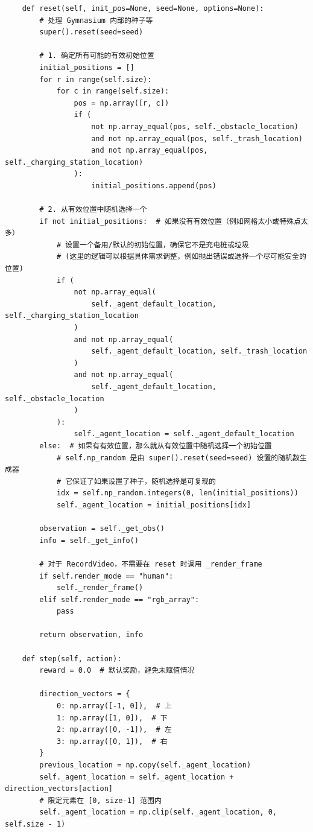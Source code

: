 \documentclass[citestyle=gb7714-2015, bibstyle=gb7714-2015,lang=cn,14pt,scheme=chinese]{elegantbook}
\begin{document}
\begin{verbatim}
    def reset(self, init_pos=None, seed=None, options=None):
        # 处理 Gymnasium 内部的种子等
        super().reset(seed=seed)

        # 1. 确定所有可能的有效初始位置
        initial_positions = []
        for r in range(self.size):
            for c in range(self.size):
                pos = np.array([r, c])
                if (
                    not np.array_equal(pos, self._obstacle_location)
                    and not np.array_equal(pos, self._trash_location)
                    and not np.array_equal(pos, self._charging_station_location)
                ):
                    initial_positions.append(pos)

        # 2. 从有效位置中随机选择一个
        if not initial_positions:  # 如果没有有效位置（例如网格太小或特殊点太多）
            # 设置一个备用/默认的初始位置，确保它不是充电桩或垃圾
            # (这里的逻辑可以根据具体需求调整，例如抛出错误或选择一个尽可能安全的位置)
            if (
                not np.array_equal(
                    self._agent_default_location, self._charging_station_location
                )
                and not np.array_equal(
                    self._agent_default_location, self._trash_location
                )
                and not np.array_equal(
                    self._agent_default_location, self._obstacle_location
                )
            ):
                self._agent_location = self._agent_default_location
        else:  # 如果有有效位置，那么就从有效位置中随机选择一个初始位置
            # self.np_random 是由 super().reset(seed=seed) 设置的随机数生成器
            # 它保证了如果设置了种子，随机选择是可复现的
            idx = self.np_random.integers(0, len(initial_positions))
            self._agent_location = initial_positions[idx]

        observation = self._get_obs()
        info = self._get_info()

        # 对于 RecordVideo，不需要在 reset 时调用 _render_frame
        if self.render_mode == "human":
            self._render_frame()
        elif self.render_mode == "rgb_array":
            pass

        return observation, info

    def step(self, action):
        reward = 0.0  # 默认奖励，避免未赋值情况

        direction_vectors = {
            0: np.array([-1, 0]),  # 上
            1: np.array([1, 0]),  # 下
            2: np.array([0, -1]),  # 左
            3: np.array([0, 1]),  # 右
        }
        previous_location = np.copy(self._agent_location)
        self._agent_location = self._agent_location + direction_vectors[action]
        # 限定元素在 [0, size-1] 范围内
        self._agent_location = np.clip(self._agent_location, 0, self.size - 1)


\end{verbatim}
\end{document}

